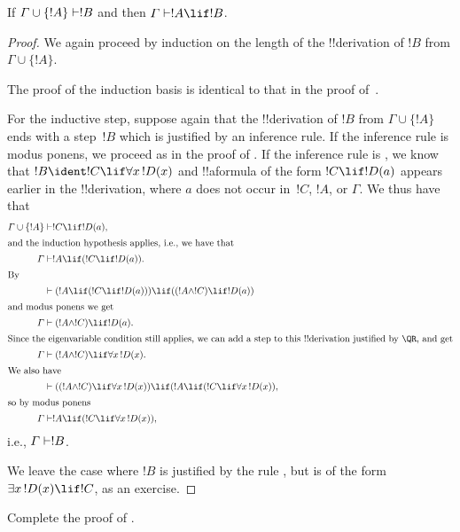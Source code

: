 \documentclass[../../../include/open-logic-section]{subfiles}
\begin{document}


\begin{thm}
 If $\Gamma \cup \{!A\} \Proves !B$ and
then $\Gamma \Proves !A \lif !B$.
\end{thm}

\begin{proof}
We again proceed by induction on the length
of the !!{derivation} of $!B$ from $\Gamma \cup \{!A\}$.

The proof of the induction basis is identical to that in the proof
of~.

For the inductive step, suppose again that the !!{derivation} of $!B$
from $\Gamma \cup \{!A\}$ ends with a step~$!B$ which is justified by
an inference rule. If the inference rule is modus ponens, we proceed
as in the proof of . If the inference
rule is \QR, we know that $!B \ident !C \lif \lforall[x][!D(x)]$ and
!!a{formula} of the form $!C \lif !D(a)$ appears earlier in the
!!{derivation}, where $a$ does not occur in~$!C$, $!A$, or $\Gamma$. We
thus have that
\begin{align*}
  \Gamma \cup \{!A\} & \Proves !C \lif !D(a),\\
  \intertext{and the induction hypothesis applies, i.e., we have that}
    \Gamma & \Proves !A \lif (!C \lif !D(a)).\\
  \intertext{By}
  & \Proves (!A \lif (!C \lif !D(a))) \lif ((!A \land !C) \lif !D(a))\\
  \intertext{and modus ponens we get}
  \Gamma & \Proves (!A \land !C) \lif !D(a).\\
  \intertext{Since the eigenvariable condition still applies, we can add a step to this !!{derivation} justified by \QR, and get}
    \Gamma & \Proves (!A \land !C) \lif \lforall[x][!D(x)].\\
    \intertext{We also have}
    & \Proves ((!A \land !C) \lif \lforall[x][!D(x)]) \lif (!A \lif (!C \lif \lforall[x][!D(x)]),\\
    \intertext{so by modus ponens}
    \Gamma & \Proves !A \lif (!C \lif \lforall[x][!D(x)]),
\end{align*}
i.e., $\Gamma \Proves !B$.

We leave the case where $!B$ is justified by the rule \QR, but is of
the form $\lexists[x][!D(x)] \lif !C$, as an exercise.
\end{proof}

\begin{prob}
  Complete the proof of .
\end{prob}
\end{document}
